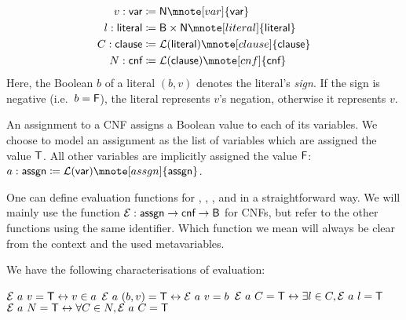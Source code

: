 \newcommand*{\bvar}{\textsf{var}}
\newcommand*{\literal}{\textsf{literal}}
\newcommand*{\clause}{\textsf{clause}}
\newcommand*{\cnf}{\textsf{cnf}}
\newcommand*{\assgn}{\textsf{assgn}}
\newcommand*{\eval}{\mathcal{E}}
\newcommand*{\evalA}[2]{\eval~#1~#2}
\begin{align*}
  v : \bvar &\defeq \nat \mnote[var]{\bvar}\\
  l : \literal &\defeq \bool \times \nat \mnote[literal]{\literal}\\
  C : \clause &\defeq \listsof{\literal} \mnote[clause]{\clause}\\
  N : \cnf &\defeq \listsof{\clause} \mnote[cnf]{\cnf}
\end{align*}
Here, the Boolean $b$ of a literal $(b, v)$ denotes the literal's \textit{sign}. If the sign is negative (i.e.\ $b = \mathsf{F}$), the literal represents $v$'s negation, otherwise it represents $v$.

An assignment to a CNF assigns a Boolean value to each of its variables. We choose to model an assignment as the list of variables which are assigned the value $\mathsf{T}$. All other variables are implicitly assigned the value $\mathsf{F}$:
$a : \assgn \defeq \listsof{\bvar}\mnote[assgn]{\assgn}$.

One can define evaluation functions \mnotec{$\eval$} for ,
, , and  in a straightforward way. 
We will mainly use the function $\eval : \assgn \rightarrow \cnf \rightarrow \bool$ for CNFs, but refer to the other functions using the same identifier. 
Which function we mean will always be clear from the context and the used metavariables. 

We have the following characterisations of evaluation:
\begin{lemma}\label{lem:cnf_eval_equiv}\leavevmode
  \begin{enumerate}
     $\evalA{a}{v} = \btrue \leftrightarrow v \in a$ 
     $\evalA{a}{(b, v)} = \btrue \leftrightarrow \evalA{a}{v} = b$
     $\evalA{a}{C} = \btrue \leftrightarrow \exists l \in C, \evalA{a}{l} = \btrue$
     $\evalA{a}{N} = \btrue \leftrightarrow \forall C \in N, \evalA{a}{C} = \btrue$
  \end{enumerate}
\end{lemma}

